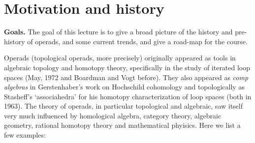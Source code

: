 

\section{Motivation and history}\label{lecture:theintro}
 
\textbf{Goals.} The goal of this lecture is to
give a broad picture of the history and 
pre-history of operads, and some current trends,
and give a road-map for the course.  
  
Operads (topological operads, more precisely)
originally appeared as tools in algebraic
topology and homotopy theory, 
specifically in the study of iterated loop 
spaces (May, 1972 and Boardman and Vogt before).
They also appeared as \emph{comp algebras} in Gerstenhaber's 
work on Hochschild cohomology and topologically as 
Stasheff's `associahedra' for his homotopy
characterization of loop spaces (both in 1963).
The theory of operads, in particular topological
and algebraic, saw itself very much influenced by
homological algebra, category theory, algebraic
geometry, rational homotopy theory and mathematical
phyisics. Here we list a few examples:

